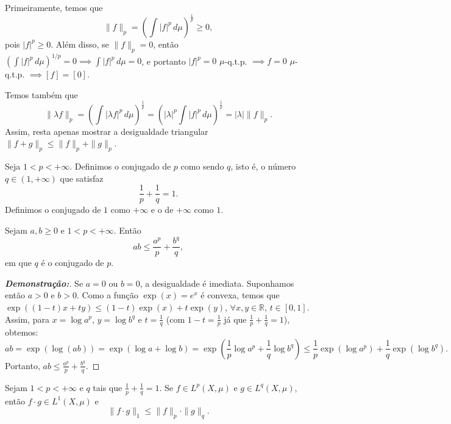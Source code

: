 Primeiramente, temos que
$$ \|f\|_p = \left( \int |f|^p \, d\mu \right)^{\frac{1}{p}} \ge 0, $$
pois $|f|^p \ge 0$. Além disso, se $\|f\|_p = 0$, então $\left(\int |f|^p \, d\mu\right)^{1/p} = 0 \implies \int |f|^p \, d\mu = 0$, e portanto $|f|^p = 0$ $\mu$-q.t.p. $\implies f = 0$ $\mu$-q.t.p. $\implies [f] = [0]$.

Temos também que
$$ \|\lambda f\|_p = \left( \int |\lambda f|^p \, d\mu \right)^{\frac{1}{p}} = \left( |\lambda|^p \int |f|^p \, d\mu \right)^{\frac{1}{p}} = |\lambda| \|f\|_p. $$
Assim, resta apenas mostrar a desigualdade triangular $\|f+g\|_p \le \|f\|_p + \|g\|_p$.

\begin{definition*}{}
Seja $1 < p < +\infty$. Definimos o conjugado de $p$ como sendo $q$, isto é, o número $q \in (1, +\infty)$ que satisfaz
$$ \frac{1}{p} + \frac{1}{q} = 1. $$
Definimos o conjugado de $1$ como $+\infty$ e o de $+\infty$ como $1$.
\end{definition*}

\begin{lemma*}
Sejam $a, b \ge 0$ e $1 < p < +\infty$. Então
$$ ab \le \frac{a^p}{p} + \frac{b^q}{q}, $$
em que $q$ é o conjugado de $p$.
\end{lemma*}

\begin{proof}[\textbf{Demonstração:}]
Se $a = 0$ ou $b = 0$, a desigualdade é imediata. Suponhamos então $a > 0$ e $b > 0$.
Como a função $\exp(x) = e^x$ é convexa, temos que $\exp((1-t)x + ty) \le (1-t)\exp(x) + t\exp(y)$, $\forall x, y \in \mathbb{R}$, $t \in [0,1]$.
Assim, para $x = \log a^p$, $y = \log b^q$ e $t = \frac{1}{q}$ (com $1-t = \frac{1}{p}$ já que $\frac{1}{p} + \frac{1}{q} = 1$), obtemos:
$$ ab = \exp(\log(ab)) = \exp(\log a + \log b) = \exp\left(\frac{1}{p}\log a^p + \frac{1}{q}\log b^q\right) \le \frac{1}{p}\exp(\log a^p) + \frac{1}{q}\exp(\log b^q). $$
Portanto, $ab \le \frac{a^p}{p} + \frac{b^q}{q}$.
\end{proof}

\begin{theorem*}
Sejam $1 < p < +\infty$ e $q$ tais que $\frac{1}{p} + \frac{1}{q} = 1$. Se $f \in L^p(X, \mu)$ e $g \in L^q(X, \mu)$, então $f \cdot g \in L^1(X, \mu)$ e
$$ \|f \cdot g\|_1 \le \|f\|_p \cdot \|g\|_q. $$
\end{theorem*}

